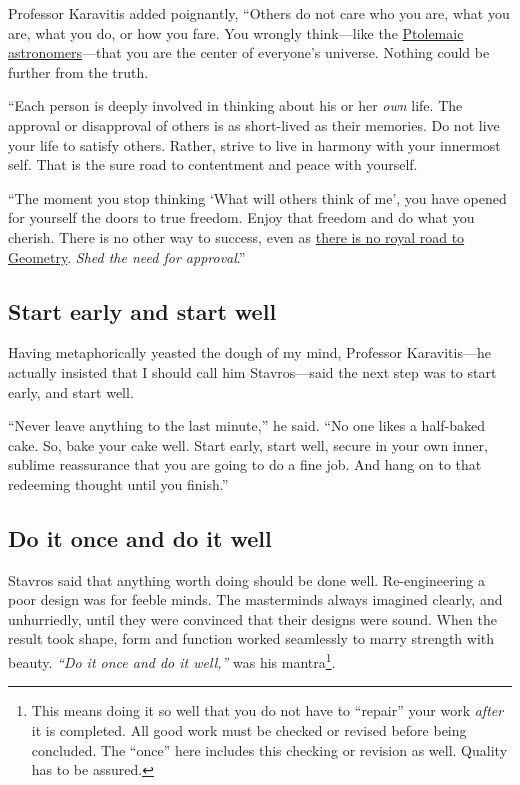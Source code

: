 \documentclass[
  a4paper,
]{article}
\begin{document}
Professor Karavitis added poignantly, ``Others do not care who you are,
what you are, what you do, or how you fare. You wrongly think---like the
\href{https://www.princeton.edu/~hos/mike/texts/ptolemy/ptolemy.html}{Ptolemaic
astronomers}---that you are the center of everyone's universe. Nothing
could be further from the truth.

``Each person is deeply involved in thinking about his or her \emph{own}
life. The approval or disapproval of others is as short-lived as their
memories. Do not live your life to satisfy others. Rather, strive to
live in harmony with your innermost self. That is the sure road to
contentment and peace with yourself.

``The moment you stop thinking `What will others think of me', you have
opened for yourself the doors to true freedom. Enjoy that freedom and do
what you cherish. There is no other way to success, even as
\href{https://idioms.thefreedictionary.com/royal+road+to}{there is no
royal road to Geometry}. \emph{Shed the need for approval}.''

\subsection{Start early and start
well}\label{start-early-and-start-well}

Having metaphorically yeasted the dough of my mind, Professor
Karavitis---he actually insisted that I should call him Stavros---said
the next step was to start early, and start well.

``Never leave anything to the last minute,'' he said. ``No one likes a
half-baked cake. So, bake your cake well. Start early, start well,
secure in your own inner, sublime reassurance that you are going to do a
fine job. And hang on to that redeeming thought until you finish.''

\subsection{Do it once and do it well}\label{do-it-once-and-do-it-well}

Stavros said that anything worth doing should be done well.
Re-engineering a poor design was for feeble minds. The masterminds
always imagined clearly, and unhurriedly, until they were convinced that
their designs were sound. When the result took shape, form and function
worked seamlessly to marry strength with beauty. \emph{``Do it once and
do it well,''} was his mantra\footnote{This means doing it so well that
  you do not have to ``repair'' your work \emph{after} it is completed.
  All good work must be checked or revised before being concluded. The
  ``once'' here includes this checking or revision as well. Quality has
  to be assured.  \normalfont}.
\end{document}
